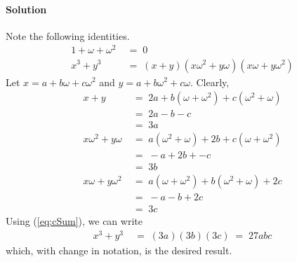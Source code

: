 \documentclass[a4paper, 11pt, reqno]{article}
\def\solution{\paragraph{Solution}}
\begin{document}
	\solution
	Note the following identities.
	\begin{align}
		1 + \omega + \omega ^2  \; &= \; 0 	\label{eq:cRoots}	\\ 
		x^3 + y^3  \; &= \;  (x + y)(x\omega^2 + y\omega)(x\omega + y\omega^2) \label{eq:cSum}
	\end{align}
	Let $x  =  a + b\omega + c\omega ^2$ and $y  =  a + b\omega ^2 + c\omega$.
	Clearly,
	\begin{align*}
		x + y \; &= \; 2a + b(\omega + \omega^2) + c (\omega^2 + \omega )	\\
			\; &= \;  2a - b - c 			\\
			\; &= \;  3a				\\
		x\omega^2 + y\omega  \; &= \; a(\omega^2 + \omega) + 2b + c(\omega + \omega^2) \\
			\; &= \;  - a + 2b + - c		\\
			\; &= \;  3b				\\
		x\omega + y\omega^2  \; &= \; a(\omega + \omega^2) + b(\omega ^2 + \omega) + 2c \\
			\; &= \;  - a - b + 2c			\\
			\; &= \;  3c				
	\end{align*}
	Using (\ref{eq:cSum}), we can write
	\begin{align*}
		x^3 + y^3 \; &= \; (3a)(3b)(3c)  \; = \; 27abc  
	\end{align*}
	which, with change in notation, is the desired result.
\end{document}
